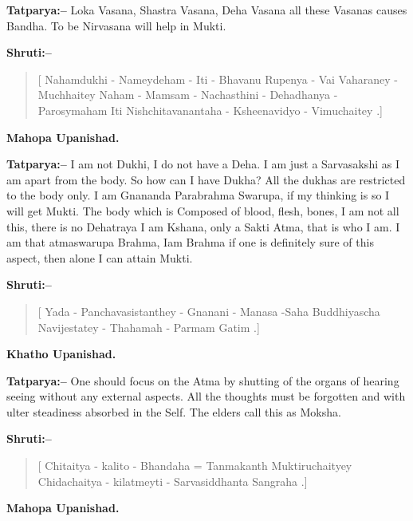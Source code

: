 \textbf{Tatparya:–} Loka Vasana, Shastra Vasana, Deha Vasana all these Vasanas causes Bandha. To be Nirvasana will help in Mukti.

\textbf{Shruti:–}

\begin{verse}
[ Nahamdukhi - Nameydeham - Iti - Bhavanu Rupenya - Vai Vaharaney - Muchhaitey Naham - Mamsam - Nachasthini - Dehadhanya - Parosymaham  Iti Nishchitavanantaha - Ksheenavidyo - Vimuchaitey .]
\end{verse}

\begin{flushright}
\textbf{Mahopa Upanishad.}
\end{flushright}

\textbf{Tatparya:–} I am not Dukhi, I do not have a Deha. I am just a Sarvasakshi as I am apart from the body. So how can I have Dukha? All the dukhas are restricted to the body only. I am Gnananda Parabrahma Swarupa, if my thinking is so I will get Mukti. The body which is Composed of blood, flesh, bones, I am not all this, there is no Dehatraya I am Kshana, only a Sakti Atma, that is who I am. I am that atmaswarupa Brahma, Iam Brahma if one is definitely sure of this aspect, then alone I can attain Mukti.

\textbf{Shruti:–}

\begin{verse}
[ Yada - Panchavasistanthey - Gnanani - Manasa -\break Saha  Buddhiyascha Navijestatey - Thahamah - Parmam Gatim .]
\end{verse}

\begin{flushright}
\textbf{Khatho Upanishad.}
\end{flushright}

\textbf{Tatparya:–} One should focus on the Atma by shutting of the organs of hearing seeing without any external aspects. All the thoughts must be forgotten and with ulter steadiness absorbed in the Self. The elders call this as Moksha.

\textbf{Shruti:–}

\begin{verse}
[ Chitaitya - kalito - Bhandaha = Tanmakanth Mukti\break ruchaityey  Chidachaitya - kilatmeyti - Sarvasiddhanta Sangraha .]
\end{verse}

\begin{flushright}
\textbf{Mahopa Upanishad.}
\end{flushright}

